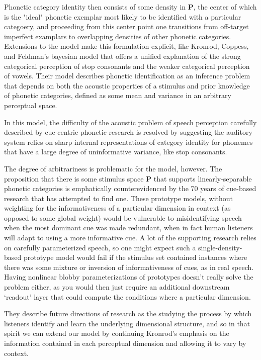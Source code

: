 Phonetic category identity then consists of some density in $\mathbf{P}$, the center of which is the "ideal" phonetic exemplar most likely to be identified with a particular categoery, and proceeding from this center point one transitions from off-target imperfect examplars to overlapping densities of other phonetic categories. Extensions to the model make this formulation explicit, like Kronrod, Coppess, and Feldman's\citep{Kronrod2016a} bayesian model that offers a unified explanation of the strong categorical perception of stop consonants and the weaker categorical perception of vowels. Their model describes phonetic identification as an inference problem that depends on both the acoustic properties of a stimulus and prior knowledge of phonetic categories, defined as some mean and variance in an arbitrary perceptual space. 

In this model, the difficulty of the acoustic problem of speech perception carefully described by cue-centric phonetic research is resolved by suggesting the auditory system relies on sharp internal representations of category identity for phonemes that have a large degree of uninformative variance, like stop consonants.

The degree of arbitrariness is problematic for the model, however. The proposition that there is some stimulus space $\mathbf{P}$ that supports linearly-separable phonetic categories is emphatically counterevidenced by the 70 years of cue-based research that has attempted to find one\citep{remezPerceptualOrganizationSpeech1994,Lisker1977}. These prototype models, without weighting for the informativeness of a particular dimension in context (as opposed to some global weight) would be vulnerable to misidentifying speech when the most dominant cue was made redundant, when in fact human listeners will adapt to using a more informative cue. A lot of the supporting research relies on carefully parameterized speech, so one might expect such a single-density-based prototype model would fail if the stimulus set contained instances where there was some mixture or inversion of informativeness of cues, as in real speech. Having nonlinear blobby parameterizations of prototypes doesn't really solve the problem either, as you would then just require an additional downstream `readout' layer that could compute the conditions where a particular dimension. 

They describe future directions of research as the studying the process by which listeners identify and learn the underlying dimensional structure, and so in that spirit we can extend our model by continuing Kronrod's emphasis on the information contained in each perceptual dimension and allowing it to vary by context.

